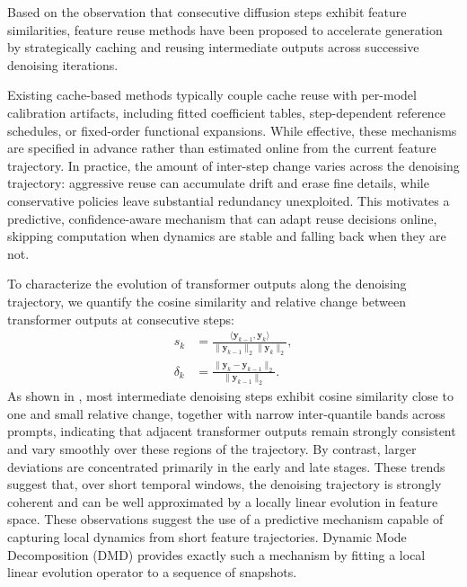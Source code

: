 Based on the observation that consecutive diffusion steps
exhibit feature similarities,
feature reuse methods \cite{
    Xu_2018,
    wimbauer2024cachecanacceleratingdiffusion,
    selvaraju2024forafastforwardcachingdiffusion,
    zou2024accelerating,
    zou2025rethinkingtokenwisefeaturecaching}
have been proposed to accelerate generation
by strategically caching
and reusing intermediate outputs
across successive denoising iterations.

Existing cache-based methods
typically couple cache reuse with per-model calibration artifacts,
including fitted coefficient tables,
step-dependent reference schedules,
or fixed-order functional expansions.
While effective,
these mechanisms are specified in advance
rather than estimated online from the current feature trajectory.
In practice,
the amount of inter-step change
varies across the denoising trajectory:
aggressive reuse can accumulate drift and erase fine details,
while conservative policies
leave substantial redundancy unexploited.
This motivates a predictive, confidence-aware mechanism
that can adapt reuse decisions online,
skipping computation when dynamics are stable
and falling back when they are not.

To characterize the evolution of transformer outputs along the denoising trajectory,
we quantify the cosine similarity and relative change
between transformer outputs at consecutive steps:
\begin{equation}
    \begin{aligned}
        s_k &=
        \frac{\langle \mathbf{y}_{k-1}, \mathbf{y}_k \rangle}
        {\|\mathbf{y}_{k-1}\|_2 \|\mathbf{y}_k\|_2}, \\
        \delta_k &=
        \frac{\|\mathbf{y}_k - \mathbf{y}_{k-1}\|_2}
        {\|\mathbf{y}_{k-1}\|_2}.
    \end{aligned}
    \label{eq:intro:step-similarity}
\end{equation}
As shown in ,
most intermediate denoising steps exhibit cosine similarity close to one
and small relative change, together with narrow inter-quantile bands across prompts,
indicating that adjacent transformer outputs remain strongly consistent
and vary smoothly over these regions of the trajectory.
By contrast,
larger deviations are concentrated primarily in the early and late stages.
These trends suggest that,
over short temporal windows,
the denoising trajectory is strongly coherent
and can be well approximated by a locally linear evolution
in feature space.
These observations suggest the use of a predictive mechanism
capable of capturing local dynamics from short feature trajectories.
Dynamic Mode Decomposition (DMD) \cite{kutz2016dynamic,dey2022dynamicmodedecompositionkoopman}
provides exactly such a mechanism
by fitting a local linear evolution operator to a sequence of snapshots.

